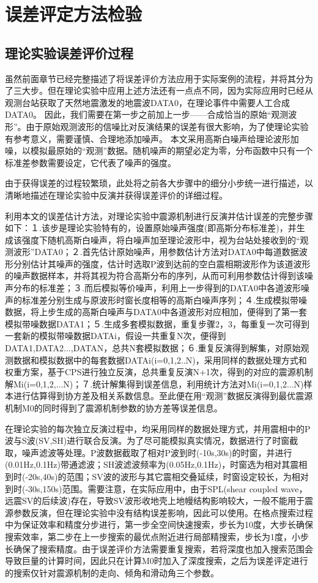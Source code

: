 \section{误差评定方法检验}

\subsection{理论实验误差评价过程}
虽然前面章节已经完整描述了将误差评价方法应用于实际案例的流程，并将其分为了三大步。但在理论实验中应用上述方法还有一点点不同，因为实际应用时已经从观测台站获取了天然地震激发的地震波DATA0，在理论事件中需要人工合成DATA0。
因此，我们需要在第一步之前加上一步——合成恰当的原始“观测波形”。由于原始观测波形的信噪比对反演结果的误差有很大影响，为了使理论实验有参考意义，需要谨慎、合理地添加噪声。
本文采用高斯白噪声给理论波形加噪，以模拟最原始的“观测”数据。随机噪声的期望必定为零，分布函数中只有一个标准差参数需要设定，它代表了噪声的强度。

由于获得误差的过程较繁琐，此处将之前各大步骤中的细分小步统一进行描述，以清晰地描述在理论实验中反演并获得误差评价的详细过程。

利用本文的误差估计方法，对理论实验中震源机制进行反演并估计误差的完整步骤如下：１.该步是理论实验特有的，设置原始噪声强度(即高斯分布标准差)，并生成该强度下随机高斯白噪声，将白噪声加至理论波形中，视为台站处接收到的“观测波形”DATA0；２.首先估计原始噪声，用参数估计方法对DATA0中每道数据波形分别估计其噪声的强度，估计时选取P波到达前的空白震相期波形作为该道波形的噪声数据样本，并将其视为符合高斯分布的序列，从而可利用参数估计得到该噪声分布的标准差；３.而后模拟等价噪声，利用上一步得到的DATA0中各道波形噪声的标准差分别生成与原波形时窗长度相等的高斯白噪声序列；４.生成模拟带噪数据，将上步生成的高斯白噪声与DATA0中各道波形对应相加，便得到了第一套模拟带噪数据DATA1；５.生成多套模拟数据，重复步骤2，3，每重复一次可得到一套新的模拟带噪数据DATAi，假设一共重复N次，便得到DATA1,DATA2...,DATAN，总共N套模拟数据；６.重复反演得到解集，对原始观测数据和模拟数据中的每套数据DATAi(i=0,1,2..N)，采用同样的数据处理方式和权重方案，基于CPS进行独立反演，总共重复反演N+1次，得到的对应的震源机制解Mi(i=0,1,2,...N)；７.统计解集得到误差信息，利用统计方法对Mi(i=0,1,2...N)样本进行估算得到协方差及相关系数信息。至此便在用“观测”数据反演得到最优震源机制M0的同时得到了震源机制参数的协方差等误差信息。

在理论实验的每次独立反演过程中，均采用同样的数据处理方式，并用震相中的P波与S波(SV,SH)进行联合反演。为了尽可能模拟真实情况，数据进行了时窗截取，噪声滤波等处理。P波数据截取了相对P波到时(-10s,30s)的时窗，并进行(0.01Hz,0.1Hz)带通滤波；SH波滤波频率为(0.05Hz,0.1Hz)，时窗选为相对其震相到时(-20s,40s)的范围；SV波的波形与其它震相交叠延续，时窗设定较长，为相对到时(-30s,150s)范围。需要注意，在实际应用中，由于SPL(shear coupled wave，远震SV的后续波)存在，导致SV波形收地壳上地幔结构影响较大，一般不能用于震源参数反演\citep{Aki1980}，但在理论实验中没有结构误差影响，因此可以使用。在格点搜索过程中为保证效率和精度分步进行，第一步全空间快速搜索，步长为10度，大步长确保搜索效率，第二步在上一步搜索的最优点附近进行局部精搜索，步长为1度，小步长确保了搜索精度。由于误差评价方法需要重复搜索，若将深度也加入搜索范围会导致巨量的计算时间，因此只在计算M0时加入了深度搜索，之后为误差评定进行的搜索仅针对震源机制的走向、倾角和滑动角三个参数。

